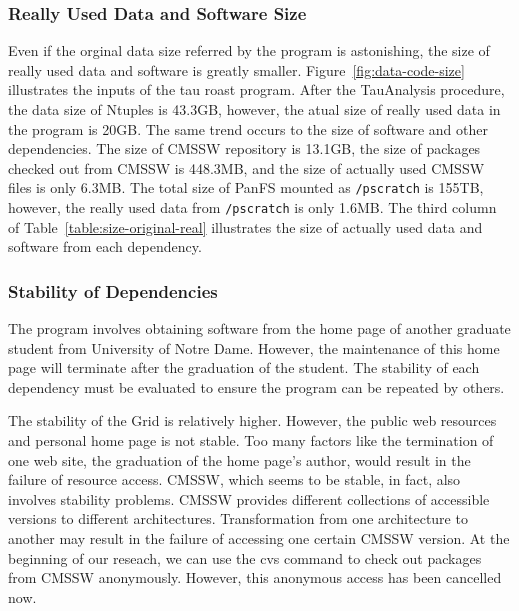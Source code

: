 \documentclass{acm_proc_article-sp}
\begin{document}
\subsubsection{Really Used Data and Software Size} 

Even if the orginal data size referred by the program is astonishing, the size
of really used data and software is greatly smaller.
Figure~\ref{fig:data-code-size} illustrates the inputs of the tau roast program.
After the TauAnalysis procedure, the data size of Ntuples is 43.3GB, however, the atual size of really used
data in the program is 20GB.  The same trend occurs to the size of software and
other dependencies. The size of CMSSW repository is 13.1GB, the size of
packages checked out from CMSSW is 448.3MB, and the size of actually used CMSSW
files is only 6.3MB. 
The total size of PanFS mounted as {\tt /pscratch} is 155TB, however, the really used data from {\tt /pscratch} is only 1.6MB.
The third column of Table~\ref{table:size-original-real} illustrates the size of actually used data and software from each dependency.

\subsubsection{Stability of Dependencies}

The program involves obtaining software from the home page of another graduate
student from University of Notre Dame. However, the maintenance of this
home page will terminate after the graduation of the student.
The stability of each dependency must be evaluated to ensure the program can be 
repeated by others.

The stability of the Grid is relatively higher. However, the
public web resources and personal home page is not stable. Too many factors
like the termination of one web site, the graduation of the home page's author,
would result in the failure of resource access. CMSSW, which seems to be
stable, in fact, also involves stability problems. CMSSW provides different
collections of accessible versions to different architectures. Transformation
from one architecture to another may result in the failure of accessing one
certain CMSSW version. At the beginning of our reseach, we can use the cvs command to
check out packages from CMSSW anonymously. However, this anonymous access has
been cancelled now.
\end{document}

